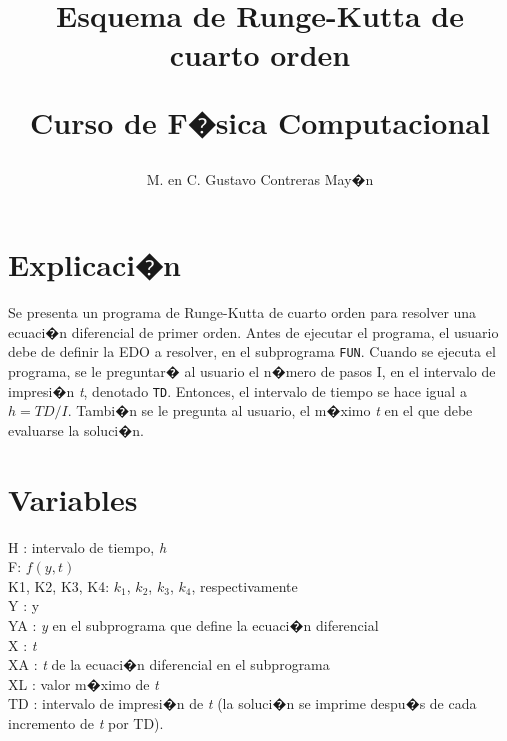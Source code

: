 \documentclass[11pt]{article}
\title{Esquema de Runge-Kutta de cuarto orden \\ \begin{large}Curso de F�sica Computacional\end{large}}
\author{M. en C. Gustavo Contreras May�n}
\date{ }
\begin{document}
\maketitle
\section{Explicaci�n}
Se presenta un programa de Runge-Kutta de cuarto orden para resolver una ecuaci�n diferencial de primer orden. Antes de ejecutar el programa, el usuario debe de definir la EDO a resolver, en el subprograma \texttt{FUN}. Cuando se ejecuta el programa, se le preguntar� al usuario el n�mero de pasos I, en el intervalo de impresi�n \textit{t}, denotado \texttt{TD}. Entonces, el intervalo de tiempo se hace igual a $h = TD/I$. Tambi�n se le pregunta al usuario, el m�ximo \textit{t} en el que debe evaluarse la soluci�n.
\section{Variables}
H : intervalo de tiempo, \textit{h} \\
F: $f(y,t)$ \\
K1, K2, K3, K4: $k_{1}$, $k_{2}$, $k_{3}$, $k_{4}$, respectivamente \\
Y : y \\
YA : \textit{y} en el subprograma que define la ecuaci�n diferencial \\
X : \textit{t} \\
XA : \textit{t} de la ecuaci�n diferencial en el subprograma \\
XL : valor m�ximo de \textit{t} \\
TD : intervalo de impresi�n de \textit{t} (la soluci�n se imprime despu�s de cada incremento de \textit{t} por TD).
\end{document}

